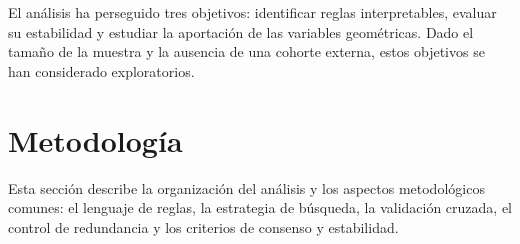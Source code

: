 El análisis ha perseguido tres objetivos: identificar reglas interpretables, evaluar su estabilidad y estudiar la aportación de las variables geométricas. Dado el tamaño de la muestra y la ausencia de una cohorte externa, estos objetivos se han considerado exploratorios.



\section{Metodología}

Esta sección describe la organización del análisis y los aspectos metodológicos comunes: el lenguaje de reglas, la estrategia de búsqueda, la validación cruzada, el control de redundancia y los criterios de consenso y estabilidad.





